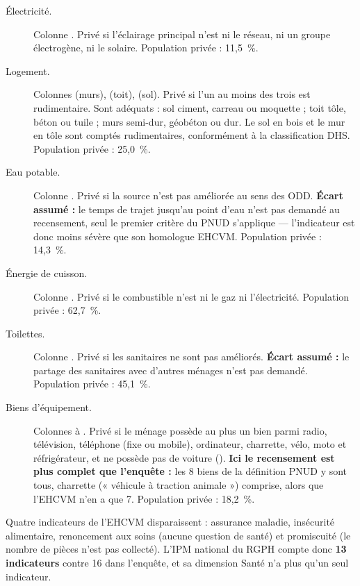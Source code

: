 \documentclass[11pt,a4paper]{article}
\begin{document}
\begin{description}
  \item[Électricité.] Colonne . Privé si l'éclairage principal n'est ni le réseau, ni
  un groupe électrogène, ni le solaire. Population privée : 11,5~\%.

  \item[Logement.] Colonnes  (murs),  (toit),  (sol). Privé si l'un
  au moins des trois est rudimentaire. Sont adéquats : sol ciment, carreau ou moquette ; toit
  tôle, béton ou tuile ; murs semi-dur, géobéton ou dur. Le sol en bois et le mur en tôle sont
  comptés rudimentaires, conformément à la classification DHS. Population privée : 25,0~\%.

  \item[Eau potable.] Colonne . Privé si la source n'est pas améliorée au sens des ODD.
  \textbf{Écart assumé :} le temps de trajet jusqu'au point d'eau n'est pas demandé au
  recensement, seul le premier critère du PNUD s'applique --- l'indicateur est donc moins sévère
  que son homologue EHCVM. Population privée : 14,3~\%.

  \item[Énergie de cuisson.] Colonne . Privé si le combustible n'est ni le gaz ni
  l'électricité. Population privée : 62,7~\%.

  \item[Toilettes.] Colonne . Privé si les sanitaires ne sont pas améliorés.
  \textbf{Écart assumé :} le partage des sanitaires avec d'autres ménages n'est pas demandé.
  Population privée : 45,1~\%.

  \item[Biens d'équipement.] Colonnes  à . Privé si le ménage possède au
  plus un bien parmi radio, télévision, téléphone (fixe ou mobile), ordinateur, charrette, vélo,
  moto et réfrigérateur, et ne possède pas de voiture (). \textbf{Ici le recensement
  est plus complet que l'enquête :} les 8 biens de la définition PNUD y sont tous, charrette
  (« véhicule à traction animale ») comprise, alors que l'EHCVM n'en a que 7. Population
  privée : 18,2~\%.
\end{description}

\begin{retenir}
Quatre indicateurs de l'EHCVM disparaissent : assurance maladie, insécurité alimentaire,
renoncement aux soins (aucune question de santé) et promiscuité (le nombre de pièces n'est pas
collecté). L'IPM national du RGPH compte donc \textbf{13 indicateurs} contre 16 dans l'enquête,
et sa dimension Santé n'a plus qu'un seul indicateur.
\end{retenir}
\end{document}
